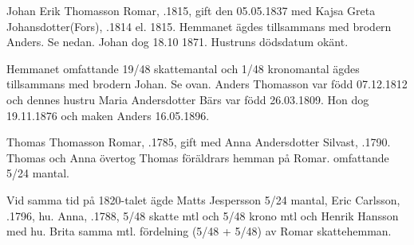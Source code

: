 %
Johan Erik Thomasson Romar, .1815, gift den 05.05.1837 med Kajsa Greta Johansdotter(Fors), .1814 el. 1815.
Hemmanet ägdes tillsammans med brodern Anders. Se nedan. Johan dog 18.10 1871. Hustruns dödsdatum okänt.
\begin{jhchildren}
  \item {}
  \item {}
  \item {}
  \item {}
\end{jhchildren}


%
Hemmanet omfattande 19/48 skattemantal och 1/48 kronomantal ägdes tillsammans med brodern Johan. Se ovan. Anders Thomasson var född 07.12.1812 och dennes hustru Maria Andersdotter Bärs var född 26.03.1809. Hon dog 19.11.1876 och maken Anders 16.05.1896.
\begin{jhchildren}
  \item {}
  \item {}
\end{jhchildren}


%
Thomas Thomasson Romar, .1785, gift med Anna Andersdotter Silvast, .1790. Thomas och Anna övertog Thomas föräldrars hemman på Romar. omfattande 5/24 mantal.

Vid samma tid på 1820-talet ägde Matts Jespersson 5/24 mantal, Eric Carlsson, .1796, hu. Anna, .1788,  5/48 skatte mtl och 5/48 krono mtl och Henrik Hansson med hu. Brita samma mtl. fördelning (5/48 + 5/48) av Romar skattehemman.
\begin{jhchildren}
  \item {}
  \item {}
  \item {}
  \item {}
\end{jhchildren}

